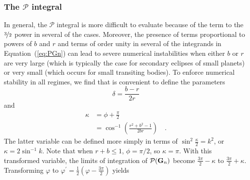 \documentclass[modern]{aastex61}
\begin{document}
\subsubsection{The $\mathcal{P}$ integral}
\label{app:P}

In general, the $\mathcal{P}$ integral is more difficult to evaluate because
of the term to the $\nicefrac{3}{2}$ power in several of the cases.
Moreover, the presence of terms proportional to powers of $b$
and $r$ and terms of order unity in several of the integrands in
Equation~(\ref{eq:PGn}) can lead to severe numerical instabilities when
either $b$ or $r$ are very large (which is typically the case for secondary eclipses
of small planets) or very small (which occurs for small transiting bodies).
%
To enforce numerical stability in all regimes, we find that is convenient to
define the parameters
%
\begin{equation}
    \label{eq:delta}
    \delta = \frac{b-r}{2r}
\end{equation}
%
and
%
\begin{align}
    \label{eq:kappa}
    \kappa &= \phi + \frac{\pi}{2} \nonumber \\
           &= \cos^{-1} \left(\frac{r^2+b^2-1}{2br}\right)
           \quad.
\end{align}
%
The latter variable can be defined more simply in terms of $\sin^2\tfrac{\kappa}{2} = k^2$,
or $\kappa = 2 \sin^{-1}k$. Note that when $r+b \le 1$, $\phi=\pi/2$, so $\kappa = \pi$.
With this transformed variable, the limits of integration of $\mathcal{P}({\mathbf{G}}_n)$
become $\tfrac{3\pi}{2}-\kappa$ to $\tfrac{3\pi}{2}+\kappa$.  Transforming
$\varphi$ to $\varphi^\prime = \frac{1}{2}(\varphi - \tfrac{3\pi}{2})$ yields
%
\end{document}
